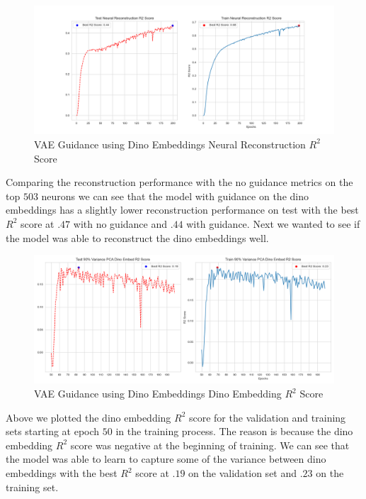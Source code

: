 \documentclass[12pt, letterpaper]{article}
\begin{document}
\begin{figure}[H]
    \centering
    \includegraphics[width=1.0\textwidth]{x_r2_128dim_503_top_var_200_epochs_0.05_beta_2_layer_.9_pca_dino_embed.png}
    \caption{VAE Guidance using Dino Embeddings Neural Reconstruction $R^2$ Score}
    \label{fig:vae_guidance_dino_pca}
\end{figure}

Comparing the reconstruction performance with the no guidance metrics on the top $503$ neurons we can see that the model with guidance on the dino embeddings has a slightly lower reconstruction performance on test with the best $R^2$ score at $.47$ with no guidance and $.44$ with guidance. Next we wanted to see if the model was able to reconstruct the dino embeddings well.

\begin{figure}[H]
    \centering
    \includegraphics[width=.9\textwidth]{.9_pca_dino_embed_r2_128dim_503_top_var_200_epochs_0.05_beta_2_layer.png}
    \caption{VAE Guidance using Dino Embeddings Dino Embedding $R^2$ Score}
    \label{fig:vae_guidance_dino_pca_dino_embed_r2}
\end{figure}

Above we plotted the dino embedding $R^2$ score for the validation and training sets starting at epoch $50$ in the training process. The reason is because the dino embedding $R^2$ score was negative at the beginning of training. We can see that the model was able to learn to capture some of the variance between dino embeddings with the best $R^2$ score at $.19$ on the validation set and $.23$ on the training set.
\end{document}
